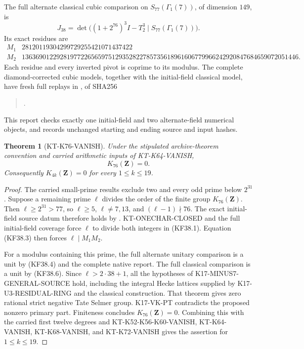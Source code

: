 \documentclass[11pt,a4paper]{article}
\newtheorem{theorem}{Theorem}[section]
\theoremstyle{definition}
\begin{document}
The full alternate classical cubic comparison on
$S_{77}(\Gamma_1(7))$, of dimension $149$, is
\[
 J_{38}=\det\bigl((1+2^{76})^3I-T_2^3
                              \mid S_{77}(\Gamma_1(7))\bigr).
                                                               \tag{KF38.5}
\]
Its exact residues are
{\footnotesize
\[
\begin{array}{c|r}
 M_1&28120119304299729255421071437422\\
 M_2&13636901229281977226565975129352822785735618961606779966242920847684659072051446.
\end{array}                                                \tag{KF38.6}
\]
}
Each residue and every inverted pivot is coprime to its modulus.
The complete diamond-corrected cubic models, together with the
initial-field classical model, have fresh full replays in
, of SHA256
\begin{quote}\small
{}.
\end{quote}
This report checks exactly one initial-field and two
alternate-field numerical objects, and records unchanged
starting and ending source and input hashes.

\begin{theorem}[KT-K76-VANISH]
\label{thm:kt-k76-vanish}
Under the stipulated archive-theorem convention and carried
arithmetic inputs of KT-K64-VANISH,
\[
                         K_{76}(\mathbf Z)=0.
\]
Consequently $K_{4k}(\mathbf Z)=0$ for every $1\leq k\leq19$.
\end{theorem}
\begin{proof}
The carried small-prime results exclude two and every odd
prime below $2^{31}$.  Suppose a remaining prime $\ell$
divides the order of the finite group $K_{76}(\mathbf Z)$.
Then $\ell\geq2^{31}>77$, so $\ell\geq5$, $\ell\ne7,13$,
and $(\ell-1)\nmid76$.  The exact initial-field source datum
therefore holds by .
KT-ONECHAR-CLOSED and the full initial-field coverage force
$\ell$ to divide both integers in (KF38.1).  Equation (KF38.3)
then forces $\ell\mid M_1M_2$.

For a modulus containing this prime, the full alternate
unitary comparison is a unit by (KF38.4) and the complete
native report.  The full classical comparison is a unit
by (KF38.6).  Since $\ell>2\cdot38+1$, all the hypotheses
of K17-MINUS7-GENERAL-SOURCE hold, including the integral
Hecke lattices supplied by K17-U3-RESIDUAL-RING and the
classical construction.  That theorem gives zero rational
strict negative Tate Selmer group.  K17-VK-PT contradicts
the proposed nonzero primary part.  Finiteness concludes
$K_{76}(\mathbf Z)=0$.  Combining this with the carried
first twelve degrees and KT-K52-K56-K60-VANISH,
KT-K64-VANISH, KT-K68-VANISH, and KT-K72-VANISH gives
the assertion for $1\leq k\leq19$.
\end{proof}
\end{document}
